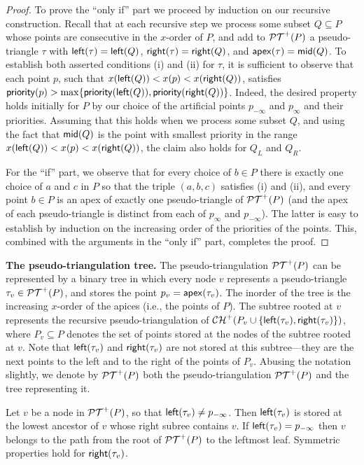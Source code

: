 \documentclass[11pt]{article}
\def\CH{{\mathcal{CH}}}
\def\PT{{\cal PT}}
\def\prior{{\sf priority}}
\def\Left{{\sf left}}
\def\Right{{\sf right}}
\def\apex{{\sf apex}}
\def\Mid{{\sf mid}}
\begin{document}
\begin{proof}
  To prove the ``only if'' part we proceed by induction on our
  recursive construction.  Recall that at each recursive step we
  process some subset $Q\subseteq P$ whose points are
  consecutive in the $x$-order of $P$, and add to
  $\PT^+(P)$ a pseudo-triangle $\tau$ with
  $\Left(\tau)=\Left(Q)$, $\Right(\tau)=\Right(Q)$, and
  $\apex(\tau)=\Mid(Q)$.  To establish both asserted conditions (i)
  and (ii) for $\tau$, it is sufficient to observe that each point
  $p$, such that $x(\Left(Q)) < x(p) < x(\Right(Q))$, satisfies
  $\prior(p) > \max\{\prior(\Left(Q)),\prior(\Right(Q))\}$.  Indeed,
  the desired property holds initially for $P$ by our choice of
  the artificial points $p_{-\infty}$ and $p_{\infty}$ and their
  priorities. Assuming that this holds when we process some subset
  $Q$, and using the fact that $\Mid(Q)$ is the point with smallest
  priority in the range $x(\Left(Q)) < x(p) < x(\Right(Q))$, the claim
  also holds for $Q_L$ and $Q_R$.

  For the ``if'' part, we observe that for every choice of $b\in P$
  there is exactly one choice of $a$ and $c$ in $P$ so that the triple
  $(a,b,c)$ satisfies (i) and (ii), and every point $b\in P$ is an
  apex of exactly one pseudo-triangle of $\PT^+(P)$ (and the
  apex of each pseudo-triangle is distinct from each of
  $p_\infty$ and $p_{-\infty}$). 
  The latter is easy to establish by induction on the increasing order of the priorities of the points.
  This, combined with the arguments in the
  ``only if'' part, completes the proof.
\end{proof}

\medskip
\noindent
{\bf The pseudo-triangulation tree.}
The pseudo-triangulation $\PT^+(P)$ can be represented by a binary
tree in which every node $v$ represents a pseudo-triangle $\tau_v\in
\PT^+(P)$, and stores the point $p_v=\apex(\tau_v)$. The inorder
of the tree is the increasing $x$-order of the apices (i.e., the points of $P$). The subtree
rooted at $v$ represents the recursive pseudo-triangulation of
$\CH^+(P_v\cup\{\Left(\tau_v),\Right(\tau_v)\})$, where $P_v\subseteq
P$ denotes the set of points stored at the nodes of the subtree rooted
at $v$. Note that $\Left(\tau_v)$ and $\Right(\tau_v)$ are not stored
at this subtree---they are the next points to the left and to the
right of the points of $P_v$.
Abusing the notation slightly, we denote by $\PT^+(P)$ both the
pseudo-triangulation $\PT^+(P)$ and the tree
representing it.

\medskip
{}
Let $v$ be a node in $\PT^+(P)$, so that $\Left(\tau_v)\neq p_{-\infty}$. Then $\Left(\tau_v)$ is stored at the lowest ancestor of $v$ whose right subree contains $v$. If $\Left(\tau_v)=p_{-\infty}$ then $v$ belongs to the path from the root of $\PT^+(P)$ to the leftmost leaf. Symmetric properties hold for $\Right(\tau_v)$. 
\end{document}
